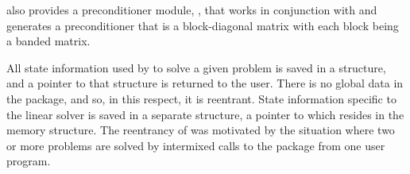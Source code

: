 {\idas} also provides a preconditioner module, {\idabbdpre}, that works
in conjunction with {\nvecp} and generates a preconditioner that is a
block-diagonal matrix with each block being a banded matrix.

All state information used by {\idas} to solve a given problem is saved
in a structure, and a pointer to that structure is returned to the
user.  There is no global data in the {\idas} package, and so, in this
respect, it is reentrant. State information specific to the linear
solver is saved in a separate structure, a pointer to which resides in
the {\idas} memory structure. The reentrancy of {\idas} was motivated
by the situation where two or more problems are solved by
intermixed calls to the package from one user program.

